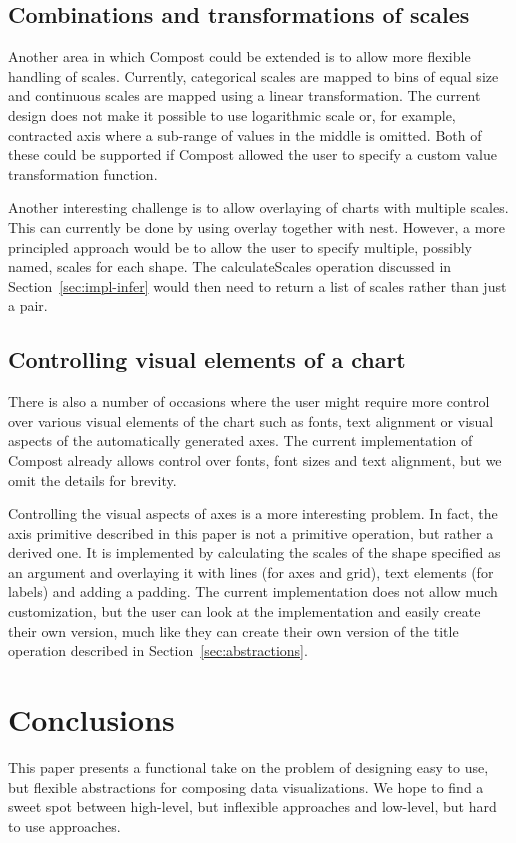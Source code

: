 \documentclass{jfp}
\newcommand{\ident}[1]{\textnormal{\textcolor{idclr}{\sffamily #1}}}
\newcommand{\kvd}[1]{\textnormal{\textcolor{kvdclr}{\sffamily #1}}}
\begin{document}
\subsection{Combinations and transformations of scales}

Another area in which Compost could be extended is to allow more flexible handling of scales.
Currently, categorical scales are mapped to bins of equal size and continuous scales are mapped
using a linear transformation. The current design does not make it possible to use logarithmic
scale or, for example, contracted axis where a sub-range of values in the middle is omitted.
Both of these could be supported if Compost allowed the user to specify a custom value
transformation function.

Another interesting challenge is to allow overlaying of charts with multiple scales. This can
currently be done by using \kvd{overlay} together with \kvd{nest}. However, a more principled
approach would be to allow the user to specify multiple, possibly named, scales for each shape.
The \ident{calculateScales} operation discussed in Section~\ref{sec:impl-infer} would then need
to return a list of scales rather than just a pair.

\subsection{Controlling visual elements of a chart}

There is also a number of occasions where the user might require more control over various
visual elements of the chart such as fonts, text alignment or visual aspects of the automatically
generated axes. The current implementation of Compost already allows control over fonts, font
sizes and text alignment, but we omit the details for brevity.

Controlling the visual aspects of axes is a more interesting problem. In fact, the
\kvd{axis} primitive described in this paper is not a primitive operation, but rather a derived
one. It is implemented by calculating the scales of the shape specified as an argument and
overlaying it with lines (for axes and grid), text elements (for labels) and adding a padding.
The current implementation does not allow much customization, but the user can look at the
implementation and easily create their own version, much like they can create their own version
of the \ident{title} operation described in Section~\ref{sec:abstractions}.

\section{Conclusions}
This paper presents a functional take on the problem of designing easy to use, but flexible
abstractions for composing data visualizations. We hope to find a sweet spot between high-level, but
inflexible approaches and low-level, but hard to use approaches.
\end{document}
